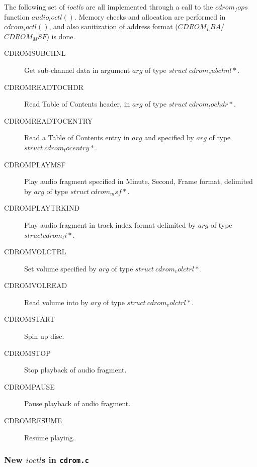 \documentclass{article}
\def\cdromc{{\tt cdrom.c}}
\begin{document}
The following set of $ioctl$s are all implemented through a call to
the $cdrom_fops$ function $audio_ioctl()$. Memory checks and
allocation are performed in $cdrom_ioctl()$, and also sanitization of
address format ($CDROM_LBA$/$CDROM_MSF$) is done.
\begin{description}
\item[CDROMSUBCHNL] Get sub-channel data in argument $arg$ of type $struct\
cdrom_subchnl *{}$.
\item[CDROMREADTOCHDR] Read Table of Contents header, in $arg$ of type
$struct\ cdrom_tochdr *{}$. 
\item[CDROMREADTOCENTRY] Read a Table of Contents entry in $arg$ and
specified by $arg$ of type $struct\ cdrom_tocentry *{}$.
\item[CDROMPLAYMSF] Play audio fragment specified in Minute, Second,
Frame format, delimited by $arg$ of type $struct\ cdrom_msf *{}$.
\item[CDROMPLAYTRKIND] Play audio fragment in track-index format
delimited by $arg$ of type $struct cdrom_ti *{}$.
\item[CDROMVOLCTRL] Set volume specified by $arg$ of type $struct\
cdrom_volctrl *{}$.
\item[CDROMVOLREAD] Read volume into by $arg$ of type $struct\
cdrom_volctrl *{}$.
\item[CDROMSTART] Spin up disc.
\item[CDROMSTOP] Stop playback of audio fragment.
\item[CDROMPAUSE] Pause playback of audio fragment.
\item[CDROMRESUME] Resume playing.
\end{description}

\subsubsection{New $ioctl$s in \cdromc}
\end{document}
